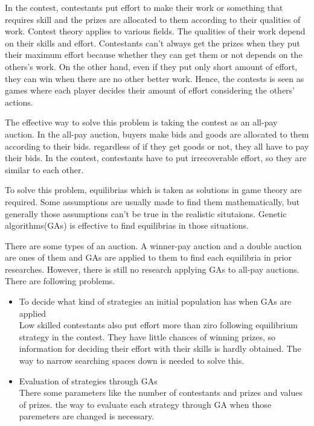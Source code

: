 \documentclass{kuisthesis}			%
\begin{document}
\begin{eabstract}				%
In the contest, contestants put effort to make their work or something that requires skill and the prizes are allocated to them according to their qualities of work. Contest theory applies to various fields. The qualities of their work depend on their skills and effort. Contestants can't always get the prizes when they put their maximum effort because whether they can get them or not depends on the others's work. On the other hand, even if they put only short amount of effort, they can win when there are no other better work. Hence, the contests is seen as games where each player decides their amount of effort considering the others' actions.\par
The effective way to solve this problem is taking the contest as an all-pay auction. In the all-pay auction, buyers make bids and goods are allocated to them according to their bids. regardless of if they get goods or not, they all have to pay their bids. In the contest, contestants have to put irrecoverable effort, so they are similar to each other.\par
To solve this problem, equilibrias which is taken as solutions in game theory are required. Some assumptions are usually made to find them mathematically, but generally those assumptions can't be true in the realistic situtaions. Genetic algorithms(GAs) is effective to find equilibrias in those situations.\par
There are some types of an auction. A winner-pay auction and a double auction are ones of them and GAs are applied to them to find each equilibria in prior researches. However, there is still no research applying GAs to all-pay auctions. There are following problems.
\begin{itemize}
\item To decide what kind of strategies an initial population has when GAs are applied\\
Low skilled contestants also put effort more than ziro following equilibrium strategy in the contest. They have little chances of winning prizes, so information for deciding their effort with their skills is hardly obtained. The way to narrow searching spaces down is needed to solve this.
\item Evaluation of strategies through GAs\\
There some parameters like the number of contestants and prizes and values of prizes. the way to evaluate each strategy through GA when those paremeters are changed is necessary.

\end{itemize}
\end{eabstract}
\end{document}
